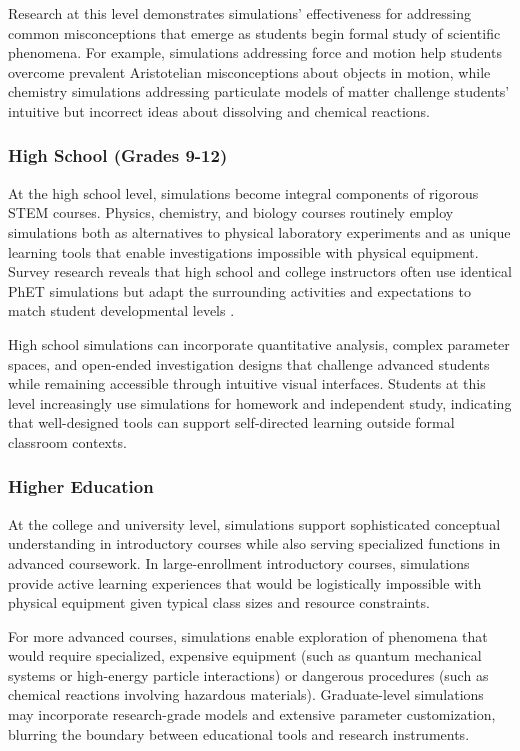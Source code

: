 Research at this level demonstrates simulations' effectiveness for addressing common misconceptions that emerge as students begin formal study of scientific phenomena. For example, simulations addressing force and motion help students overcome prevalent Aristotelian misconceptions about objects in motion, while chemistry simulations addressing particulate models of matter challenge students' intuitive but incorrect ideas about dissolving and chemical reactions.

\subsubsection{High School (Grades 9-12)}

At the high school level, simulations become integral components of rigorous STEM courses. Physics, chemistry, and biology courses routinely employ simulations both as alternatives to physical laboratory experiments and as unique learning tools that enable investigations impossible with physical equipment. Survey research reveals that high school and college instructors often use identical PhET simulations but adapt the surrounding activities and expectations to match student developmental levels \cite{phet2023}.

High school simulations can incorporate quantitative analysis, complex parameter spaces, and open-ended investigation designs that challenge advanced students while remaining accessible through intuitive visual interfaces. Students at this level increasingly use simulations for homework and independent study, indicating that well-designed tools can support self-directed learning outside formal classroom contexts.

\subsubsection{Higher Education}

At the college and university level, simulations support sophisticated conceptual understanding in introductory courses while also serving specialized functions in advanced coursework. In large-enrollment introductory courses, simulations provide active learning experiences that would be logistically impossible with physical equipment given typical class sizes and resource constraints.

For more advanced courses, simulations enable exploration of phenomena that would require specialized, expensive equipment (such as quantum mechanical systems or high-energy particle interactions) or dangerous procedures (such as chemical reactions involving hazardous materials). Graduate-level simulations may incorporate research-grade models and extensive parameter customization, blurring the boundary between educational tools and research instruments.


